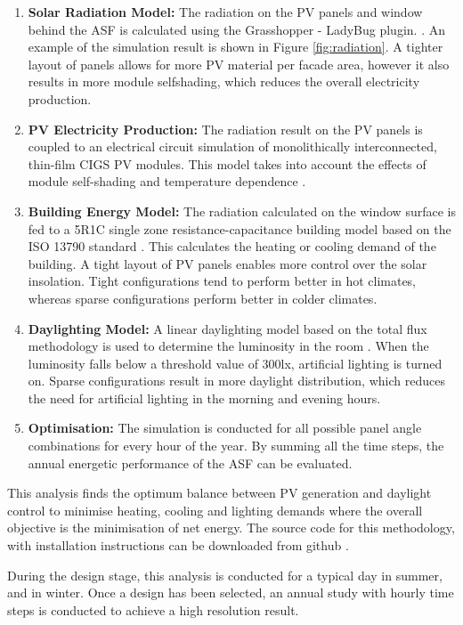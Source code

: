 \begin{enumerate}
\item \textbf{Solar Radiation Model:} The radiation on the PV panels and window behind the ASF is calculated using the Grasshopper - LadyBug plugin.  \cite{roudsari2013ladybug}. An example of the simulation result is shown in Figure \ref{fig:radiation}. A tighter layout of panels allows for more PV material per facade area, however it also results in more module selfshading, which reduces the overall electricity production.
\item \textbf{PV Electricity Production:} The radiation result on the PV panels is coupled to an electrical circuit simulation of monolithically interconnected, thin-film CIGS PV modules. This model takes into account the effects of module self-shading and temperature dependence \cite{hofer2016parametric}. 
\item \textbf{Building Energy Model:} The radiation calculated on the window surface is fed to a 5R1C single zone resistance-capacitance building model based on the ISO 13790 standard \cite{de2008iso}. This calculates the heating or cooling demand of the building. A tight layout of PV panels enables more control over the solar insolation. Tight configurations tend to perform better in hot climates, whereas sparse configurations perform better in colder climates. 
\item \textbf{Daylighting Model:} A linear daylighting model based on the total flux methodology is used to determine the luminosity in the room \cite{szokolay1980handbook}. When the luminosity falls below a threshold value of 300lx, artificial lighting is turned on. Sparse configurations result in more daylight distribution, which reduces the need for artificial lighting in the morning and evening hours.
\item \textbf{Optimisation:} The simulation is conducted for all possible panel angle combinations for every hour of the year. By summing all the time steps, the annual energetic performance of the ASF can be evaluated. 
\end{enumerate}
This analysis finds the optimum balance between PV generation and daylight control to minimise heating, cooling and lighting demands where the overall objective is the minimisation of net energy.
The source code for this methodology, with installation instructions can be downloaded from github \cite{ASFGitHub,RCGitHub}.

During the design stage, this analysis is conducted for a typical day in summer, and in winter. Once a design has been selected, an annual study with hourly time steps is conducted to achieve a high resolution result.


